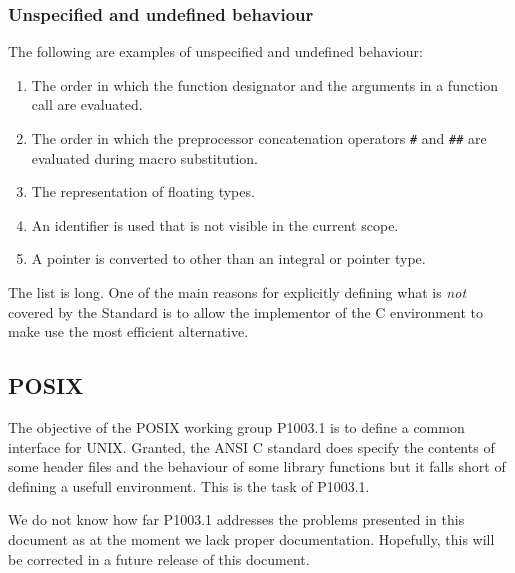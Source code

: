\subsubsection{Unspecified and undefined behaviour}

The following are examples of unspecified and undefined behaviour:

\begin{enumerate}

\item The order in which the function designator and the arguments
 in a function call are evaluated.

\item The order in which the preprocessor concatenation operators
 {\tt \#} and {\tt \#\#} are evaluated during macro substitution.

\item The representation of floating types.

\item An identifier is used that is not visible in the current scope.

\item A pointer is converted to other than an integral or pointer type.

\end{enumerate}

The list is long. One of the main reasons for explicitly defining what
is {\em not} covered by the Standard is to allow the implementor of the
C environment to make use the most efficient alternative.

\subsection{POSIX}

The objective of the POSIX working group P1003.1 is to define a common
interface for UNIX. Granted, the ANSI C standard does specify the
contents of some header files and the behaviour of some library functions
but it falls short of defining a usefull environment. This is the
task of P1003.1.

We do not know how far P1003.1 addresses the problems presented in this
document as at the moment we lack proper documentation.
Hopefully, this will be corrected in a future release of this document.


